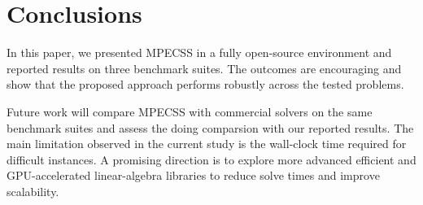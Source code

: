 \section{Conclusions}
\label{sec:conclusions}

In this paper, we presented MPECSS in a fully open-source environment and reported results on three benchmark suites. The outcomes are encouraging and show that the proposed approach performs robustly across the tested problems.

Future work will compare MPECSS with commercial solvers on the same benchmark suites and assess the doing comparsion with our reported results. The main limitation observed in the current study is the wall-clock time required for difficult instances. A promising direction is to explore more advanced efficient and GPU-accelerated linear-algebra libraries to reduce solve times and improve scalability.
